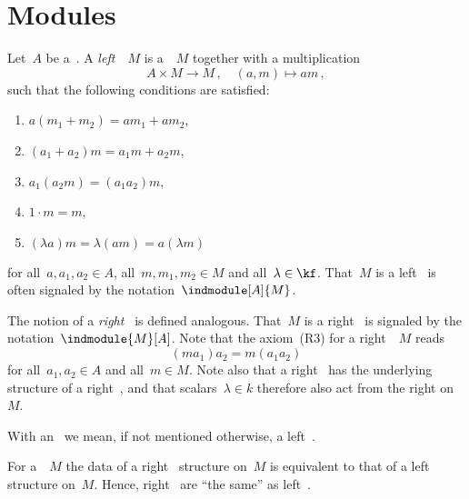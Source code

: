 \section{Modules}


\begin{definition}
  Let~$A$ be a~{\kalg}.
  A \emph{left~{}}~$M$ is a~{\module{$\kf$}}~$M$ together with a multiplication
  \[
            A \times M
    \to     M \,,
    \quad   (a,m)
    \mapsto am \,,
  \]
  such that the following conditions are satisfied:
  \begin{enumerate}[label={(L\arabic*})]
    \item
      $a(m_1 + m_2) = am_1 + am_2$,
    \item
      $(a_1 + a_2) m = a_1 m + a_2 m$,
    \item
      \label{module associative}
      $a_1 (a_2 m) = (a_1 a_2) m$,
    \item
      $1 \cdot m = m$,
    \item
      $(\lambda a)m = \lambda (am) = a (\lambda m)$
  \end{enumerate}
  for all~$a, a_1, a_2 \in A$, all~$m, m_1, m_2 \in M$ and all~$\lambda \in \kf$.
  That~$M$ is a left~{} is often signaled by the notation~$\indmodule[A]{M}$.
  
  The notion of a \emph{right~{}} is defined analogous.
  That~$M$ is a right~{} is signaled by the notation~$\indmodule{M}[A]$.
  Note that the axiom~(R3) for a right~{}~$M$ reads
  \[
      (m a_1) a_2
    = m (a_1 a_2)
  \]
  for all~$a_1, a_2 \in A$ and all~$m \in M$.
  Note also that a right~{} has the underlying structure of a right~{\module{$\kf$}}, and that scalars~$\lambda \in k$ therefore also act from the right on~$M$.
  
  With an~\emph{} we mean, if not mentioned otherwise, a left~{}.
\end{definition}


\begin{remark}
  For a~{\module{$\kf$}}~$M$ the data of a right~{} structure on~$M$ is equivalent to that of a left~{} structure on~$M$.
  Hence, right~{} are \enquote{the same} as left~{}.
\end{remark}


